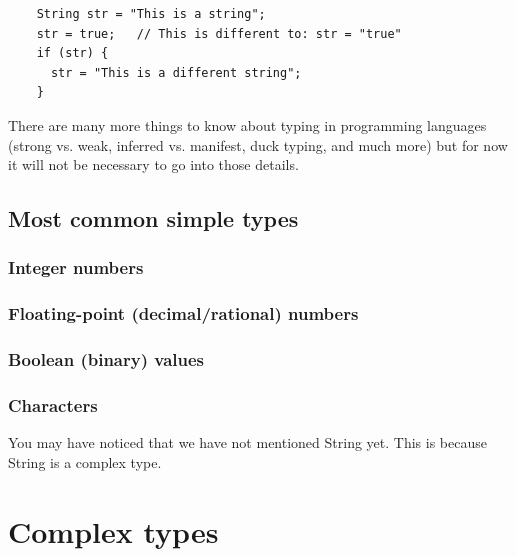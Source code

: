 \begin{verbatim}
    String str = "This is a string";
    str = true;   // This is different to: str = "true"
    if (str) {
      str = "This is a different string";
    }
\end{verbatim}

There are many more things to know about typing in programming
languages (strong vs. weak, inferred vs. manifest, duck typing, and
much more) but for now it will not be necessary to go into those
details. 

\subsection{Most common simple types}
\label{sec:most-common-simple}

\subsubsection{Integer numbers}
\label{sec:integers}

\subsubsection{Floating-point (decimal/rational) numbers}
\label{sec:float-point-decim}

\subsubsection{Boolean (binary) values}
\label{sec:bool-binary-valu}

\subsubsection{Characters}
\label{sec:characters}




You may have noticed that we have not mentioned String yet. This is
because String is a complex type. 

\section{Complex types}
\label{sec:complex-types}




